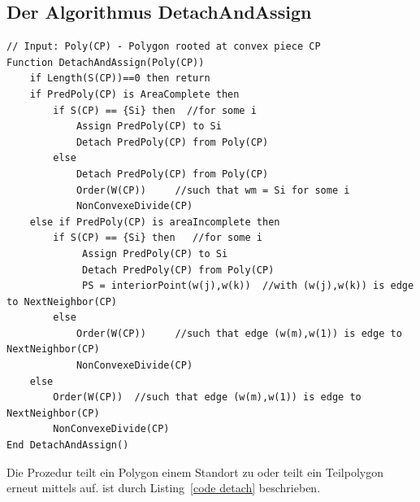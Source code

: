 \documentclass[ngerman]{seminarbeitrag}
\begin{document}
\subsection{Der Algorithmus DetachAndAssign}\label{detach}

\begin{lstlisting}[float,caption={Der Algorithmus \daa}, frame=single, label=code detach,breaklines=true,breakatwhitespace=true]
// Input: Poly(CP) - Polygon rooted at convex piece CP
Function DetachAndAssign(Poly(CP))
    if Length(S(CP))==0 then return 
    if PredPoly(CP) is AreaComplete then
        if S(CP) == {Si} then  //for some i
            Assign PredPoly(CP) to Si
            Detach PredPoly(CP) from Poly(CP)
        else
            Detach PredPoly(CP) from Poly(CP)
            Order(W(CP))	 //such that wm = Si for some i
            NonConvexeDivide(CP)
    else if PredPoly(CP) is areaIncomplete then
        if S(CP) == {Si} then	//for some i
             Assign PredPoly(CP) to Si
             Detach PredPoly(CP) from Poly(CP)
             PS = interiorPoint(w(j),w(k))	//with (w(j),w(k)) is edge to NextNeighbor(CP)
        else
            Order(W(CP))	 //such that edge (w(m),w(1)) is edge to NextNeighbor(CP)
            NonConvexeDivide(CP)
    else
        Order(W(CP))  //such that edge (w(m),w(1)) is edge to NextNeighbor(CP)
        NonConvexeDivide(CP)
End DetachAndAssign()

\end{lstlisting}

Die Prozedur \daa teilt ein Polygon einem Standort zu oder teilt ein Teilpolygon erneut mittels \noncon auf. \daa ist durch Listing~\ref{code detach} beschrieben.
\end{document}

